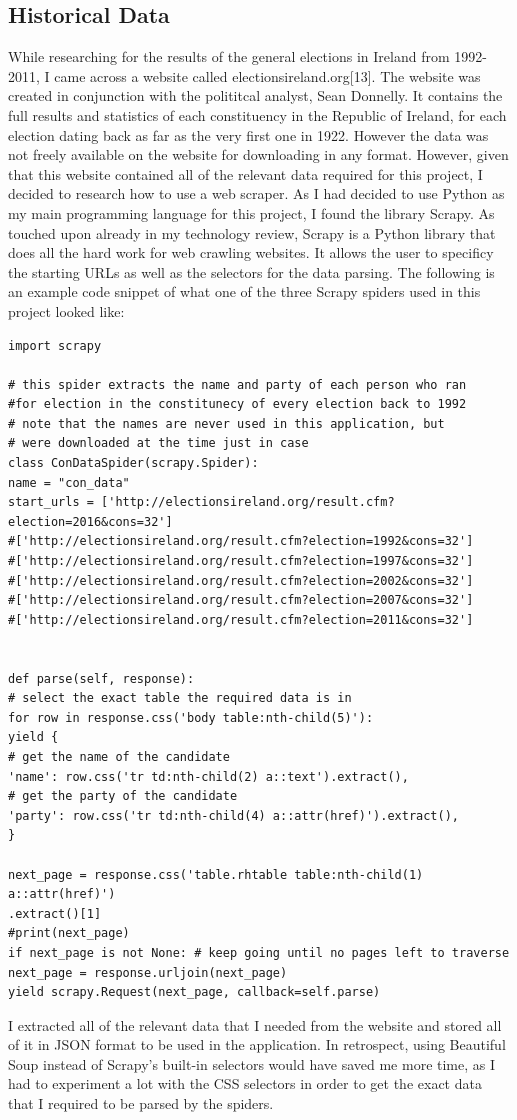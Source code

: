 \subsection{Historical Data}
While researching for the results of the general elections in Ireland from 1992-2011, I came across a website called electionsireland.org[13]. The website was created in conjunction with the polititcal analyst, Sean Donnelly. It contains the full results and statistics of each constituency in the Republic of Ireland, for each election dating back as far as the very first one in 1922. However the data was not freely available on the website for downloading in any format. However, given that this website contained all of the relevant data required for this project, I decided to research how to use a web scraper. As I had decided to use Python as my main programming language for this project, I found the library Scrapy. As touched upon already in my technology review, Scrapy is a Python library that does all the hard work for web crawling websites. It allows the user to specificy the starting URLs as well as the selectors for the data parsing. The following is an example code snippet of what one of the three Scrapy spiders used in this project looked like:
\begin{verbatim}
import scrapy

# this spider extracts the name and party of each person who ran 
#for election in the constitunecy of every election back to 1992
# note that the names are never used in this application, but 
# were downloaded at the time just in case
class ConDataSpider(scrapy.Spider):
name = "con_data"
start_urls = ['http://electionsireland.org/result.cfm?election=2016&cons=32']
#['http://electionsireland.org/result.cfm?election=1992&cons=32']
#['http://electionsireland.org/result.cfm?election=1997&cons=32']
#['http://electionsireland.org/result.cfm?election=2002&cons=32']
#['http://electionsireland.org/result.cfm?election=2007&cons=32']
#['http://electionsireland.org/result.cfm?election=2011&cons=32']


def parse(self, response):
# select the exact table the required data is in
for row in response.css('body table:nth-child(5)'): 
yield {
# get the name of the candidate
'name': row.css('tr td:nth-child(2) a::text').extract(), 
# get the party of the candidate
'party': row.css('tr td:nth-child(4) a::attr(href)').extract(), 
}

next_page = response.css('table.rhtable table:nth-child(1) a::attr(href)')
.extract()[1]
#print(next_page)
if next_page is not None: # keep going until no pages left to traverse
next_page = response.urljoin(next_page)
yield scrapy.Request(next_page, callback=self.parse)
\end{verbatim}
I extracted all of the relevant data that I needed from the website and stored all of it in JSON format to be used in the application. In retrospect,  using Beautiful Soup instead of Scrapy’s built-in selectors would have saved me more time, as I had to experiment a lot with the CSS selectors in order to get the exact data that I required to be parsed by the spiders. 
